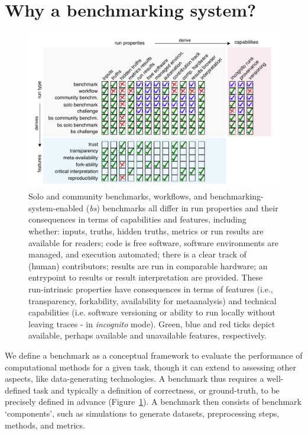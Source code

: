 \documentclass[11pt]{article}
\begin{document}
\section*{Why a benchmarking system?}


\begin{figure}
    \centering
    \includegraphics[width=\linewidth]{./figures/fig1_fig_benchmarking_aligned.pdf}
    {\color{red} \caption[Run types, properties, capabilities and features.]{Solo and community benchmarks, workflows, and benchmarking-system-enabled (\textit{bs}) benchmarks all differ in run properties and their consequences in terms of capabilities and features, including whether: inputs, truths, hidden truths, metrics or run results are available for readers; code is free software, software environments are managed, and execution automated; there is a clear track of (human) contributors; results are run in comparable hardware; an entrypoint to results or result interpretation are provided. These run-intrinsic properties have consequences in terms of features (i.e., transparency, forkability, availability for metaanalysis) and technical capabilities (i.e. software versioning or ability to run locally without leaving traces - in \textit{incognito} mode). Green, blue and red ticks depict available, perhaps available and unavailable features, respectively. \label{fig:definitions}}
    }
\end{figure}


We define a benchmark as a conceptual framework to evaluate the performance of computational methods for a given task, though it can extend to assessing other aspects, like data-generating technologies. A benchmark thus requires a well-defined task and typically a definition of correctness, or ground-truth, to be precisely defined in advance {\color{red} (Figure~\ref{fig:definitions})}. A benchmark then consists of benchmark `components', such as simulations to generate datasets, preprocessing steps, methods, and metrics. 
\end{document}
